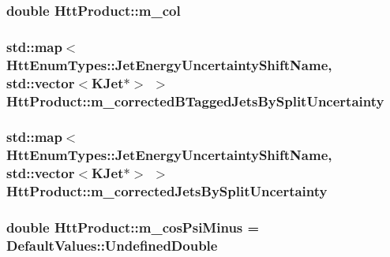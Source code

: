 \label{classHttProduct_a662eecf0d76a57e4dc516b9acef7fb6a}
\hypertarget{classHttProduct_a215a81b1db6f7bd11ff6d0ee0178386d}{
\subsubsection[{m\_\-col}]{\setlength{\rightskip}{0pt plus 5cm}double {\bf HttProduct::m\_\-col}}}
\label{classHttProduct_a215a81b1db6f7bd11ff6d0ee0178386d}
\hypertarget{classHttProduct_aba1b83caaf97fb12f47642179f8a3dd6}{
\subsubsection[{m\_\-correctedBTaggedJetsBySplitUncertainty}]{\setlength{\rightskip}{0pt plus 5cm}std::map$<${\bf HttEnumTypes::JetEnergyUncertaintyShiftName}, std::vector$<$KJet$\ast$$>$ $>$ {\bf HttProduct::m\_\-correctedBTaggedJetsBySplitUncertainty}}}
\label{classHttProduct_aba1b83caaf97fb12f47642179f8a3dd6}
\hypertarget{classHttProduct_a37927d009e750a74a32b77e1b3431fbe}{
\subsubsection[{m\_\-correctedJetsBySplitUncertainty}]{\setlength{\rightskip}{0pt plus 5cm}std::map$<${\bf HttEnumTypes::JetEnergyUncertaintyShiftName}, std::vector$<$KJet$\ast$$>$ $>$ {\bf HttProduct::m\_\-correctedJetsBySplitUncertainty}}}
\label{classHttProduct_a37927d009e750a74a32b77e1b3431fbe}
\hypertarget{classHttProduct_a059c70723ea678b74ce0e482532a276e}{
\subsubsection[{m\_\-cosPsiMinus}]{\setlength{\rightskip}{0pt plus 5cm}double {\bf HttProduct::m\_\-cosPsiMinus} = DefaultValues::UndefinedDouble}}
\label{classHttProduct_a059c70723ea678b74ce0e482532a276e}

